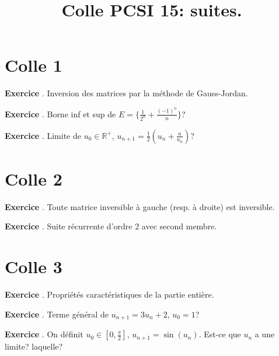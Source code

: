 \documentclass[10pt,a4paper]{article}
\title{Colle PCSI 15: suites.}
\newcounter{question}
\newcounter{exo}
\newenvironment{exo}{\vspace{0.5cm}\setcounter{question}{0}\addtocounter{exo}{1} \noindent \textbf{Exercice \theexo}. \normalsize }{\par}
\begin{document}
	\maketitle
	
	
	\section*{Colle 1}
	\setcounter{exo}{0}

	\begin{exo}
		Inversion des matrices par la méthode de Gauss-Jordan.
	\end{exo}
	
	\begin{exo}
		Borne inf et sup de $E = \lbrace \frac{1}{2^n} + \frac{(-1)^n}{n} \rbrace$?
	\end{exo}

	\begin{exo}
		Limite de $u_0 \in \mathbb{R}^+$, $u_{n+1} = \frac{1}{2} (u_n +\frac{a}{u_n})$?
	\end{exo}
	
	\section*{Colle 2}
	\setcounter{exo}{0}
		
	\begin{exo}
		Toute matrice inversible à gauche (resp. à droite) est inversible.
	\end{exo}
	
	\begin{exo}
		Suite récurrente d'ordre 2 avec second membre.
	\end{exo}		
	
	\section*{Colle 3}
	\setcounter{exo}{0}
		
	\begin{exo}
		Propriétés caractéristiques de la partie entière.
	\end{exo}
	
	\begin{exo}
		Terme général de $u_{n+1} = 3 u_n + 2$, $u_0 = 1$?
	\end{exo}	

	\begin{exo}
		On définit $u_0 \in [0, \frac{\pi}{2}]$, $u_{n+1} = \sin(u_n)$. Est-ce que $u_n$ a une limite? laquelle?
	\end{exo}	
	
\end{document}
